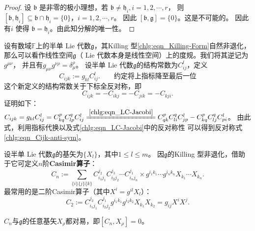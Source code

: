 \begin{proof}
    设 $\mathfrak{b}$ 是非零的极小理想，若 $\mathfrak{b} \neq \mathfrak{h}_i, i=1,2, \cdots, r$，
    则 $\left[\mathfrak{b}, \mathfrak{h}_i\right] \subseteq \mathfrak{b} \cap \mathfrak{h}_i=\{0\}$，$i=1,2, \cdots, r$。
    因此 $[\mathfrak{b}, \mathfrak{g}]=\{0\}$。这是不可能的。
    因此有$i$ 使得 $\mathfrak{b}=\mathfrak{h}_i$。由此知分解的唯一性。
\end{proof}

设有数域$\mathbb{F}$上的半单 Lie 代数$\mathfrak{g}$，其Killing 型\eqref{chlg:eqn_Killing-Form}自然非退化，
那么可以看作线性空间$\mathfrak{g}$（ Lie 代数本身是线性空间）上的度规。我们将其逆记为$g^{\mu\nu}$，
并且有$g_{\mu\nu}g^{\nu\rho}=\delta^\rho_\mu$。
设半单 Lie 代数$\mathfrak{g}$的结构常数为$C_{ij}^l$，定义
\begin{equation}
    C_{ijk} := g_{kl} C_{ij}^l .
    \qquad \text{约定将上指标降至最后一位}
\end{equation}
这个新定义的结构常数关于下标全反对称，即
\begin{equation}\label{chlg:eqn_Cijk-anti-sym}
    C_{ijk} = -C_{ikj} = -C_{jik} = -C_{kji} .
\end{equation}
证明如下：
$    C_{ijk} =  g_{kl} C_{ij}^l = C^p_{kq} C^q_{lp} C_{ij}^l
\xlongequal{\ref{chlg:eqn_LC-Jacobi}}
C^p_{qk} C^q_{li} C_{jp}^l -C^p_{kq} C^q_{lj} C_{pi}^l $。
由此式，利用指标代换以及式\eqref{chlg:eqn_LC-Jacobi}中的反对称性
可以得到反对称式\eqref{chlg:eqn_Cijk-anti-sym}。

设半单 Lie 代数$\mathfrak{g}$的基矢为$\{X_l\}$，其中$1\leqslant l \leqslant m$。
因$\mathfrak{g}$的Killing 型非退化，借助于它可定义$n$阶\textbf{Casimir算子}：
\begin{equation}
    C_n := \sum_{\{i\}\{j\}\{k\}}
    C_{i_1 j_1} ^{j_2} C_{i_2 j_2} ^{j_3}\cdots C_{i_n j_n} ^{j_1}
    \times g^{i_1 k_1} \cdots g^{i_n k_n} X_{k_1} \cdots X_{k_n} .
\end{equation}
最常用的是二阶Casimir算子（其中$X^i=g^{il}X_l$）：
\begin{equation}
    C_2 := C_{i_1 j_1} ^{j_2} C_{i_2 j_2} ^{j_1}
    g^{i_1 k_1} g^{i_2 k_2} X_{k_1} X_{k_2}
    = g_{ij} X^i X^j.
\end{equation}

\begin{theorem}
    $C_n$与$\mathfrak{g}$的任意基矢$X_\rho$都对易，即$[C_n, X_\rho]=0$。
\end{theorem}

